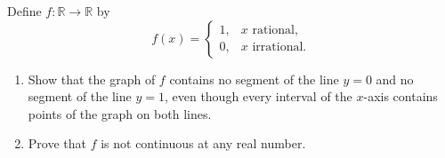 Define $f:\mathbb{R}\to\mathbb{R}$ by
\[
f(x)=\begin{cases}1,&x\text{ rational},\\0,&x\text{ irrational}.\end{cases}
\]
\begin{enumerate}
\item[(a)] Show that the graph of $f$ contains no segment of the line $y=0$ and no segment of the line $y=1$, even though every interval of the $x$-axis contains points of the graph on both lines.
\item[(b)] Prove that $f$ is not continuous at any real number.
\end{enumerate}
